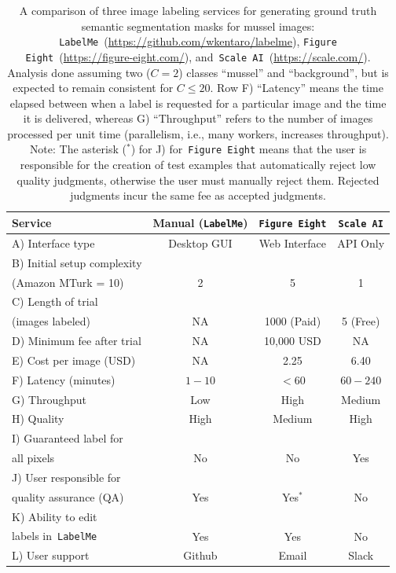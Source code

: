 \documentclass[11pt]{article} %
\begin{document}
\begin{table}[]
\centering
\caption{A comparison of three image labeling services for generating ground
truth semantic segmentation masks for mussel images:
\texttt{LabelMe}~(\url{https://github.com/wkentaro/labelme}),
\texttt{Figure Eight}~(\url{https://figure-eight.com/}),
and~\texttt{Scale AI}~(\url{https://scale.com/}).
Analysis done assuming two ($C=2$) classes ``mussel'' and ``background'', but
is expected to remain consistent for $C \leq 20$. Row F) ``Latency'' means the
time elapsed between when a label is requested for a particular image and the
time it is delivered, whereas G) ``Throughput'' refers to the number of images
processed per unit time (parallelism, i.e., many workers, increases
throughput). Note: The asterisk ($^*$) for J) for~\texttt{Figure Eight} means
that the user is responsible for the creation of test examples that
automatically reject low quality judgments, otherwise the user must manually
reject them. Rejected judgments incur the same fee as accepted judgments.}
\begin{tabular}{lccc}
\toprule
Service & Manual (\texttt{LabelMe}) & \texttt{Figure Eight} & \texttt{Scale AI} 
\\ \midrule
A) Interface type & Desktop GUI & Web Interface & API Only \\ \midrule
B) Initial setup complexity \\ (Amazon MTurk = 10) & 2 & 5 & 1 \\ \midrule
C) Length of trial \\ (images labeled) & NA & 1000 (Paid) & 5 (Free) \\ \midrule
D) Minimum fee after trial & NA & 10,000 USD & NA \\ \midrule
E) Cost per image (USD) & NA & 2.25 & 6.40 \\ \midrule
F) Latency (minutes) & $1-10$ & $< 60$ & $60-240$ \\ \midrule
G) Throughput & Low & High & Medium \\ \midrule
H) Quality & High & Medium & High \\ \midrule
I) Guaranteed label for \\ all pixels & No & No & Yes \\ \midrule
J) User responsible for \\ quality assurance (QA) & Yes & Yes$^*$ & No \\  
\midrule
K) Ability to edit \\ labels in~\texttt{LabelMe} & Yes & Yes & No \\ \midrule
L) User support & Github & Email & Slack \\ 
\bottomrule
\end{tabular}
\end{table}
\end{document}
